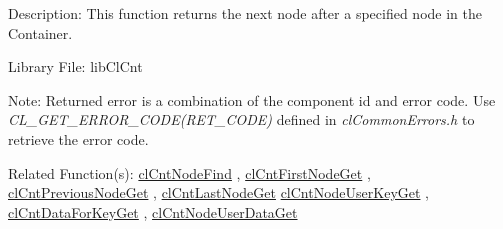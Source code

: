 \begin{Desc}
\item[Description:]This function returns the next node after a specified node in the Container.\end{Desc}
\begin{Desc}
\item[Library File:]lib\-Cl\-Cnt\end{Desc}
\begin{Desc}
\item[Note:]Returned error is a combination of the component id and error code. Use \textit{CL\_\-GET\_\-ERROR\_\-CODE(RET\_\-CODE)} defined in \textit{clCommonErrors.h} to retrieve the error code.\end{Desc}
\begin{Desc}
\item[Related Function(s):]\hyperlink{pagecnt109}{cl\-Cnt\-Node\-Find} , \hyperlink{pagecnt110}{cl\-Cnt\-First\-Node\-Get} , 
\hyperlink{pagecnt113}{cl\-Cnt\-Previous\-Node\-Get} , \hyperlink{pagecnt111}{cl\-Cnt\-Last\-Node\-Get} 
\hyperlink{pagecnt115}{cl\-Cnt\-Node\-User\-Key\-Get} , \hyperlink{pagecnt116}{cl\-Cnt\-Data\-For\-Key\-Get} , 
\hyperlink{pagecnt117}{cl\-Cnt\-Node\-User\-Data\-Get} \end{Desc}


\newpage

